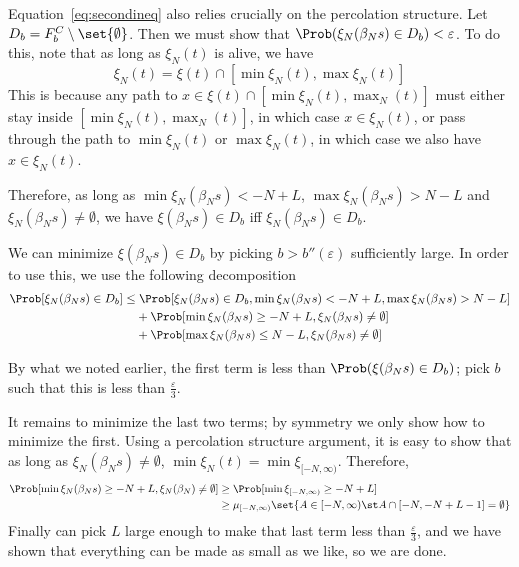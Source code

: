 \documentclass{scrartcl}
\newcommand{\ep}{\varepsilon}
\begin{document}
Equation~\ref{eq:secondineq} also relies crucially on the percolation structure. Let $D_{b} = F_{b}^{C} \setminus \set{\emptyset}$. Then we must show that $\Prob(\xi_{N}(\beta_{N}s) \in D_{b}) < \ep$. To do this, note that as long as $\xi_{N}(t)$ is alive, we have
\[ \xi_{N}(t) = \xi(t) \cap [\min \xi_{N}(t), \max \xi_{N}(t)] \]
This is because any path to $x \in \xi(t) \cap [\min \xi_{N}(t), \max_{N}(t)]$ must either stay inside $[\min \xi_{N}(t), \max_{N}(t)]$, in which case $x \in \xi_{N}(t)$, or pass through the path to $\min \xi_{N}(t)$ or $\max \xi_{N}(t)$, in which case we also have $x \in \xi_{N}(t)$.

Therefore, as long as $\min \xi_{N}(\beta_{N}s) < -N + L$, $\max \xi_{N}(\beta_{N}s) > N - L$ and $\xi_{N}(\beta_{N}s) \neq \emptyset$, we have $\xi(\beta_{N}s) \in D_{b}$ iff $\xi_{N}(\beta_{N}s) \in D_{b}$.

We can minimize $\xi(\beta_{N}s) \in D_{b}$ by picking $b > b''(\ep)$ sufficiently large. In order to use this, we use the following decomposition
\begin{align*}
  \Prob[\xi_{N}(\beta_{N}s) \in D_{b}] \leq&\; \Prob[\xi_{N}(\beta_{N}s) \in D_{b}, \min \xi_{N}(\beta_{N}s) < -N + L, \max \xi_{N}(\beta_{N}s) > N - L] \\
                                &+ \Prob[\min \xi_{N}(\beta_{N}s) \geq -N + L, \xi_{N}(\beta_{N}s) \neq \emptyset] \\
                                &+ \Prob[\max \xi_{N}(\beta_{N}s) \leq N - L, \xi_{N}(\beta_{N}s) \neq \emptyset]
\end{align*}

By what we noted earlier, the first term is less than $\Prob(\xi(\beta_{N}s) \in D_{b})$; pick $b$ such that this is less than $\frac{\ep}{3}$.

It remains to minimize the last two terms; by symmetry we only show how to minimize the first. Using a percolation structure argument, it is easy to show that as long as $\xi_{N}(\beta_{N}s) \neq \emptyset$, $\min \xi_{N}(t) = \min \xi_{[-N,\infty)}$. Therefore,
\begin{align*}
  \Prob[\min \xi_{N}(\beta_{N}s) \geq -N + L, \xi_{N}(\beta_{N}) \neq \emptyset] &\geq \Prob[\min \xi_{[-N,\infty)} \geq -N+L] \\
  &\geq \mu_{[-N,\infty)}\set{A \in [-N,\infty) \st A \cap [-N,-N+L-1] = \emptyset}
\end{align*}
Finally can pick $L$ large enough to make that last term less than $\frac{\ep}{3}$, and we have shown that everything can be made as small as we like, so we are done.
\end{document}
